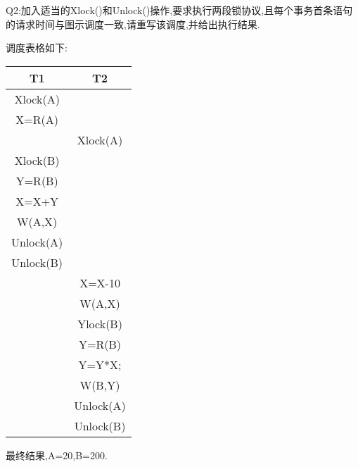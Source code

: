 Q2:加入适当的Xlock()和Unlock()操作,要求执行两段锁协议,且每个事务首条语句的请求时间与图示调度一致,请重写该调度,并给出执行结果.
\par 调度表格如下:
\begin{table}[H] 
    \centering
    \begin{tabular}{cc} %
        \toprule %
        T1 & T2  \\
        \midrule %
        Xlock(A) &  \\
        X=R(A) &  \\
        & Xlock(A) \\
        Xlock(B) & \\
        Y=R(B) & \\
        X=X+Y & \\
        W(A,X) & \\
        Unlock(A) & \\
        Unlock(B) & \\
        & X=X-10 \\
        & W(A,X) \\
        & Ylock(B) \\
        & Y=R(B) \\
        & Y=Y*X;\\
        & W(B,Y) \\
        & Unlock(A) \\
        & Unlock(B) \\
        \bottomrule %
    \end{tabular}
\end{table}
最终结果,A=20,B=200.